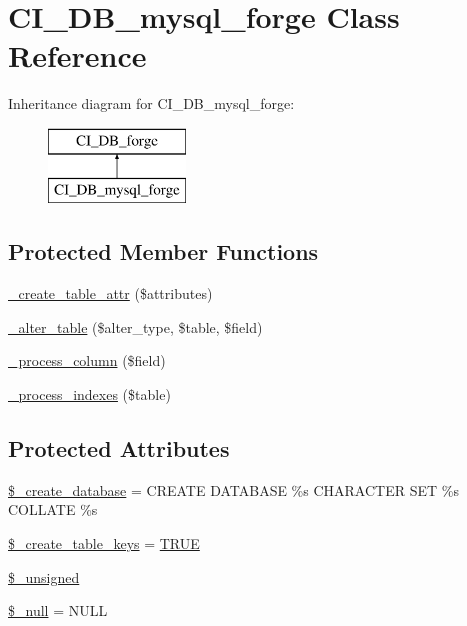 \hypertarget{class_c_i___d_b__mysql__forge}{}\section{C\+I\+\_\+\+D\+B\+\_\+mysql\+\_\+forge Class Reference}
\label{class_c_i___d_b__mysql__forge}
Inheritance diagram for C\+I\+\_\+\+D\+B\+\_\+mysql\+\_\+forge\+:\begin{figure}[H]
\begin{center}
\leavevmode
\includegraphics[height=2.000000cm]{class_c_i___d_b__mysql__forge}
\end{center}
\end{figure}
\subsection*{Protected Member Functions}
\begin{DoxyCompactItemize}
\item 
\mbox{\hyperlink{class_c_i___d_b__mysql__forge_a10b25326d82f6ddd9af1935e52e42b72}{\+\_\+create\+\_\+table\+\_\+attr}} (\$attributes)
\item 
\mbox{\hyperlink{class_c_i___d_b__mysql__forge_a41c6cae02f2fda8b429ad0afb9509426}{\+\_\+alter\+\_\+table}} (\$alter\+\_\+type, \$table, \$field)
\item 
\mbox{\hyperlink{class_c_i___d_b__mysql__forge_a8f38f1c5b5dddecca4befbe393f3f299}{\+\_\+process\+\_\+column}} (\$field)
\item 
\mbox{\hyperlink{class_c_i___d_b__mysql__forge_ae0bdb4ea3418590d1894c5b621b5ca50}{\+\_\+process\+\_\+indexes}} (\$table)
\end{DoxyCompactItemize}
\subsection*{Protected Attributes}
\begin{DoxyCompactItemize}
\item 
\mbox{\hyperlink{class_c_i___d_b__mysql__forge_acd23c9a8735806155f1a5d0a87c151f2}{\$\+\_\+create\+\_\+database}} = \textquotesingle{}C\+R\+E\+A\+TE D\+A\+T\+A\+B\+A\+SE \%s C\+H\+A\+R\+A\+C\+T\+ER S\+ET \%s C\+O\+L\+L\+A\+TE \%s\textquotesingle{}
\item 
\mbox{\hyperlink{class_c_i___d_b__mysql__forge_a73e07acdd35c948ad353903c2827af6e}{\$\+\_\+create\+\_\+table\+\_\+keys}} = \mbox{\hyperlink{constants_8php_ae04a3efe6aa42044f803ee90c2277846}{T\+R\+UE}}
\item 
\mbox{\hyperlink{class_c_i___d_b__mysql__forge_aae977ae6d61fa183f0b25422b6ddc31c}{\$\+\_\+unsigned}}
\item 
\mbox{\hyperlink{class_c_i___d_b__mysql__forge_ae58fe6a5104d4a069a49b27533ce808f}{\$\+\_\+null}} = \textquotesingle{}N\+U\+LL\textquotesingle{}
\end{DoxyCompactItemize}
